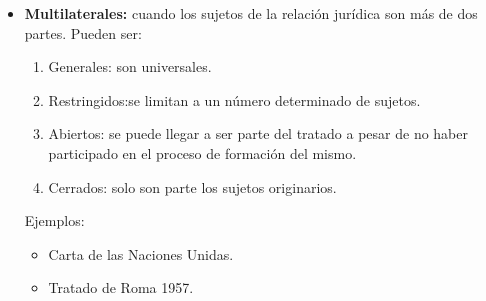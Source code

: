 \documentclass{templateApunte}
\begin{document}
\begin{enumerate}
\begin{itemize}
    \item \textbf{Multilaterales:} cuando los sujetos de la relación jurídica son m\'as de dos partes.
    Pueden ser:
    \begin{enumerate}
      \item Generales: son universales.
      \item Restringidos:se limitan a un n\'umero determinado de sujetos.
      \item Abiertos: se puede llegar a ser parte del tratado a pesar de no haber participado en el proceso de formación del mismo.
      \item Cerrados: solo son parte los sujetos originarios.
    \end{enumerate}
    Ejemplos:
    \begin{itemize}
      \item Carta de las Naciones Unidas.
      \item Tratado de Roma 1957.
    \end{itemize}
  \end{itemize}
\end{enumerate}

\newpage
\end{document}
